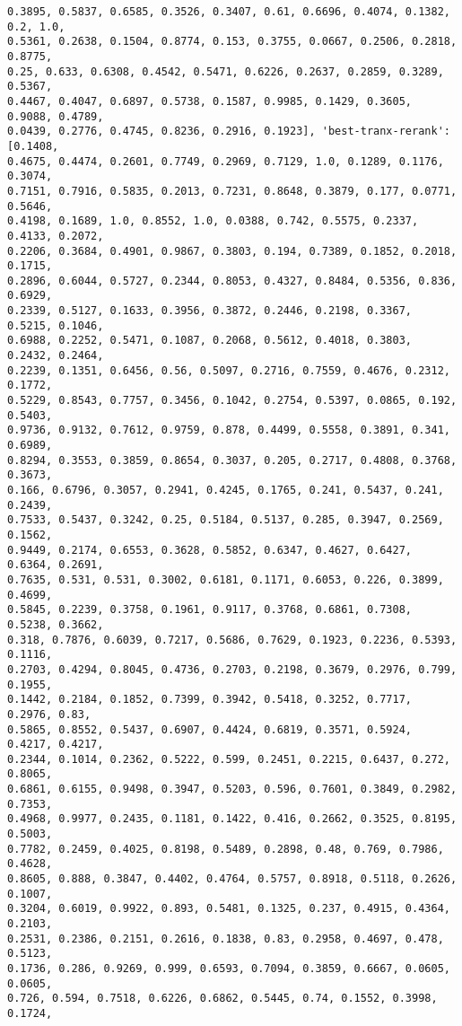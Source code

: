 \documentclass[11pt]{article}
\begin{document}
\begin{Verbatim}[commandchars=\\\{\}]
0.3895, 0.5837, 0.6585, 0.3526, 0.3407, 0.61, 0.6696, 0.4074, 0.1382, 0.2, 1.0,
0.5361, 0.2638, 0.1504, 0.8774, 0.153, 0.3755, 0.0667, 0.2506, 0.2818, 0.8775,
0.25, 0.633, 0.6308, 0.4542, 0.5471, 0.6226, 0.2637, 0.2859, 0.3289, 0.5367,
0.4467, 0.4047, 0.6897, 0.5738, 0.1587, 0.9985, 0.1429, 0.3605, 0.9088, 0.4789,
0.0439, 0.2776, 0.4745, 0.8236, 0.2916, 0.1923], 'best-tranx-rerank': [0.1408,
0.4675, 0.4474, 0.2601, 0.7749, 0.2969, 0.7129, 1.0, 0.1289, 0.1176, 0.3074,
0.7151, 0.7916, 0.5835, 0.2013, 0.7231, 0.8648, 0.3879, 0.177, 0.0771, 0.5646,
0.4198, 0.1689, 1.0, 0.8552, 1.0, 0.0388, 0.742, 0.5575, 0.2337, 0.4133, 0.2072,
0.2206, 0.3684, 0.4901, 0.9867, 0.3803, 0.194, 0.7389, 0.1852, 0.2018, 0.1715,
0.2896, 0.6044, 0.5727, 0.2344, 0.8053, 0.4327, 0.8484, 0.5356, 0.836, 0.6929,
0.2339, 0.5127, 0.1633, 0.3956, 0.3872, 0.2446, 0.2198, 0.3367, 0.5215, 0.1046,
0.6988, 0.2252, 0.5471, 0.1087, 0.2068, 0.5612, 0.4018, 0.3803, 0.2432, 0.2464,
0.2239, 0.1351, 0.6456, 0.56, 0.5097, 0.2716, 0.7559, 0.4676, 0.2312, 0.1772,
0.5229, 0.8543, 0.7757, 0.3456, 0.1042, 0.2754, 0.5397, 0.0865, 0.192, 0.5403,
0.9736, 0.9132, 0.7612, 0.9759, 0.878, 0.4499, 0.5558, 0.3891, 0.341, 0.6989,
0.8294, 0.3553, 0.3859, 0.8654, 0.3037, 0.205, 0.2717, 0.4808, 0.3768, 0.3673,
0.166, 0.6796, 0.3057, 0.2941, 0.4245, 0.1765, 0.241, 0.5437, 0.241, 0.2439,
0.7533, 0.5437, 0.3242, 0.25, 0.5184, 0.5137, 0.285, 0.3947, 0.2569, 0.1562,
0.9449, 0.2174, 0.6553, 0.3628, 0.5852, 0.6347, 0.4627, 0.6427, 0.6364, 0.2691,
0.7635, 0.531, 0.531, 0.3002, 0.6181, 0.1171, 0.6053, 0.226, 0.3899, 0.4699,
0.5845, 0.2239, 0.3758, 0.1961, 0.9117, 0.3768, 0.6861, 0.7308, 0.5238, 0.3662,
0.318, 0.7876, 0.6039, 0.7217, 0.5686, 0.7629, 0.1923, 0.2236, 0.5393, 0.1116,
0.2703, 0.4294, 0.8045, 0.4736, 0.2703, 0.2198, 0.3679, 0.2976, 0.799, 0.1955,
0.1442, 0.2184, 0.1852, 0.7399, 0.3942, 0.5418, 0.3252, 0.7717, 0.2976, 0.83,
0.5865, 0.8552, 0.5437, 0.6907, 0.4424, 0.6819, 0.3571, 0.5924, 0.4217, 0.4217,
0.2344, 0.1014, 0.2362, 0.5222, 0.599, 0.2451, 0.2215, 0.6437, 0.272, 0.8065,
0.6861, 0.6155, 0.9498, 0.3947, 0.5203, 0.596, 0.7601, 0.3849, 0.2982, 0.7353,
0.4968, 0.9977, 0.2435, 0.1181, 0.1422, 0.416, 0.2662, 0.3525, 0.8195, 0.5003,
0.7782, 0.2459, 0.4025, 0.8198, 0.5489, 0.2898, 0.48, 0.769, 0.7986, 0.4628,
0.8605, 0.888, 0.3847, 0.4402, 0.4764, 0.5757, 0.8918, 0.5118, 0.2626, 0.1007,
0.3204, 0.6019, 0.9922, 0.893, 0.5481, 0.1325, 0.237, 0.4915, 0.4364, 0.2103,
0.2531, 0.2386, 0.2151, 0.2616, 0.1838, 0.83, 0.2958, 0.4697, 0.478, 0.5123,
0.1736, 0.286, 0.9269, 0.999, 0.6593, 0.7094, 0.3859, 0.6667, 0.0605, 0.0605,
0.726, 0.594, 0.7518, 0.6226, 0.6862, 0.5445, 0.74, 0.1552, 0.3998, 0.1724,

\end{Verbatim}
\end{document}
